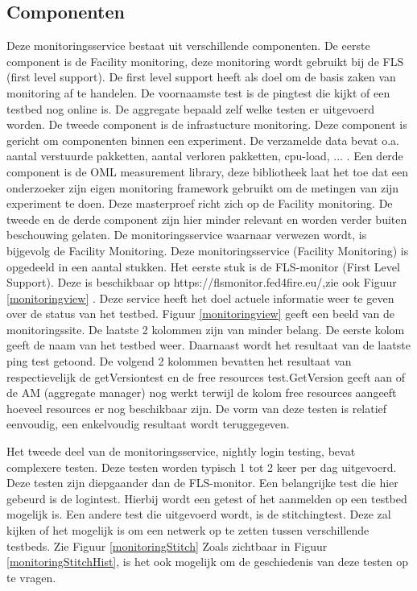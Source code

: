 \subsection{Componenten}
\npar
Deze monitoringsservice bestaat uit verschillende componenten. De eerste component is de Facility monitoring, deze monitoring wordt gebruikt bij de FLS (first level support). De first level support heeft als doel om de basis zaken van monitoring af te handelen. De voornaamste test is de pingtest die kijkt of een testbed nog online is. De aggregate bepaald zelf welke testen er uitgevoerd worden.
\clearpage
\npar
De tweede component is de infrastucture monitoring. Deze component is gericht om componenten binnen een experiment. De verzamelde data bevat o.a. aantal verstuurde pakketten, aantal verloren pakketten, cpu-load, ... .
\npar
Een derde component is de OML measurement library, deze bibliotheek laat het toe dat een onderzoeker zijn eigen monitoring framework gebruikt om de metingen van zijn experiment te doen.
\npar
Deze masterproef richt zich op de Facility monitoring. De tweede en de derde component zijn hier minder relevant en worden verder buiten beschouwing gelaten. De monitoringsservice waarnaar verwezen wordt, is bijgevolg de Facility Monitoring.
\npar
Deze monitoringsservice (Facility Monitoring) is opgedeeld in een aantal stukken. Het eerste stuk is de FLS-monitor (First Level Support). Deze is beschikbaar op https://flsmonitor.fed4fire.eu/,zie ook Figuur \ref{monitoringview} . Deze service heeft het doel actuele informatie weer te geven over de status van het testbed.
\npar
Figuur \ref{monitoringview} geeft een beeld van de monitoringssite. De laatste 2 kolommen zijn van minder belang. De eerste kolom geeft de naam van het testbed weer. Daarnaast wordt het resultaat van de laatste ping test getoond. De volgend 2 kolommen bevatten het resultaat van respectievelijk de getVersiontest en de free resources test.GetVersion geeft aan of de AM (aggregate manager) nog werkt terwijl de kolom free resources aangeeft hoeveel resources er nog beschikbaar zijn. De vorm van deze testen is relatief eenvoudig, een enkelvoudig resultaat wordt teruggegeven.

\clearpage
\npar
Het tweede deel van de monitoringsservice, nightly login testing, bevat complexere testen. Deze testen worden typisch 1 tot 2 keer per dag uitgevoerd. Deze testen zijn diepgaander dan de FLS-monitor. Een belangrijke test die hier gebeurd is de logintest. Hierbij wordt een getest of het aanmelden op een testbed mogelijk is. Een andere test die uitgevoerd wordt, is de stitchingtest. Deze zal kijken of het mogelijk is om een netwerk op te zetten tussen verschillende testbeds. Zie Figuur \ref{monitoringStitch}
Zoals zichtbaar in Figuur \ref{monitoringStitchHist}, is het ook mogelijk om de geschiedenis van deze testen op te vragen. 
\clearpage

